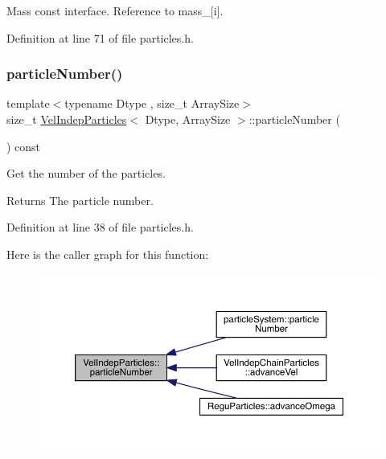 Mass const interface. Reference to mass\+\_\+\mbox{[}i\mbox{]}. 



Definition at line 71 of file particles.\+h.

\mbox{\label{class_vel_indep_particles_a9fa71261c95ee53974352a31cd8ffd41}} 
\subsubsection{\texorpdfstring{particle\+Number()}{particleNumber()}}
{\footnotesize\ttfamily template$<$typename Dtype , size\+\_\+t Array\+Size$>$ \\
size\+\_\+t \mbox{\hyperlink{class_vel_indep_particles}{Vel\+Indep\+Particles}}$<$ Dtype, Array\+Size $>$\+::particle\+Number (\begin{DoxyParamCaption}{ }\end{DoxyParamCaption}) const\hspace{0.3cm}{\ttfamily [inline]}}



Get the number of the particles. 

\begin{DoxyReturn}{Returns}
The particle number. 
\end{DoxyReturn}


Definition at line 38 of file particles.\+h.

Here is the caller graph for this function\+:\nopagebreak
\begin{figure}[H]
\begin{center}
\leavevmode
\includegraphics[width=350pt]{class_vel_indep_particles_a9fa71261c95ee53974352a31cd8ffd41_icgraph}
\end{center}
\end{figure}
\mbox{\label{class_vel_indep_particles_a3abad5914571496cf4c956647b2bafa8}} 
